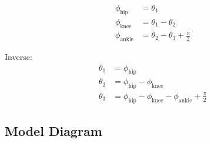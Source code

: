 \documentclass[11pt,a4paper]{article}
\begin{document}
\begin{align}
    \phi_{\text{hip}} &= \theta_1 \label{eq:hip_rel} \\
    \phi_{\text{knee}} &= \theta_1 - \theta_2 \label{eq:knee_rel} \\
    \phi_{\text{ankle}} &= \theta_2 - \theta_3 + \frac{\pi}{2} \label{eq:ankle_rel}
\end{align}

Inverse:
\begin{align}
    \theta_1 &= \phi_{\text{hip}} \\
    \theta_2 &= \phi_{\text{hip}} - \phi_{\text{knee}} \\
    \theta_3 &= \phi_{\text{hip}} - \phi_{\text{knee}} - \phi_{\text{ankle}} + \frac{\pi}{2}
\end{align}

\subsection{Model Diagram}
\end{document}
